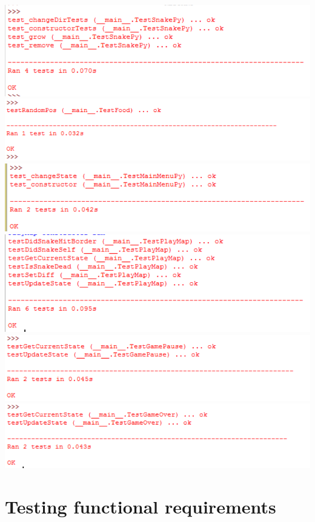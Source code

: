\documentclass[12pt]{article}
\begin{document}
\includegraphics{testSnakeResults}\newline\newline
\includegraphics{testFoodResults}\newline\newline
\includegraphics{testMainMenuResults}\newline\newline
\includegraphics{testPlayMapResults}\newline\newline
\includegraphics{testGamePauseResults}\newline\newline
\includegraphics{testGameOverResults}\newline\newline

\section{Testing functional requirements}
\end{document}
